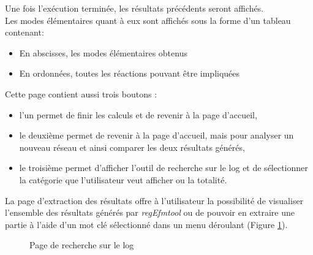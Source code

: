 Une fois l'exécution terminée, les résultats précédents seront affichés.\\
Les modes élémentaires quant à eux sont affichés sous la forme d'un tableau contenant:
\begin{itemize}
\item En abscisses, les modes élémentaires obtenus
\item En ordonnées, toutes les réactions pouvant être impliquées\\
\end{itemize}

Cette page contient aussi trois boutons : 
\begin{itemize}
\item l'un permet de finir les calculs et de revenir à la page d'accueil,
\item le deuxième permet de revenir à la page d'accueil, mais pour analyser un nouveau réseau et ainsi comparer les deux résultats générés, 
\item le troisième permet d'afficher l'outil de recherche sur le log et de sélectionner la catégorie que l'utilisateur veut afficher ou la totalité.\\
\end{itemize}

La page d'extraction des résultats offre à l'utilisateur la possibilité de visualiser l'ensemble des résultats générés par \textit{regEfmtool} ou de pouvoir en extraire une partie à l'aide d'un mot clé sélectionné dans un menu déroulant (Figure \ref{rechercheLog}).

\begin{figure}[!ht]
	\begin{center}
		\caption{Page de recherche sur le log}
  		\label{rechercheLog}
  	\end{center}	
\end{figure}








 
